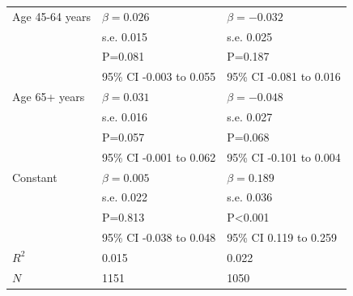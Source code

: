 \begin{table}[H]
\begin{tabular}{lll}
\rowcolor[gray]{0.93}
Age 45-64 years & $\beta=0.026$ & $\beta=-0.032$ \\ 
\rowcolor[gray]{0.93}
 & s.e. 0.015 & s.e. 0.025 \\ 
\rowcolor[gray]{0.93}
 & P=0.081 & P=0.187 \\ 
\rowcolor[gray]{0.93}
 & 95\% CI -0.003 to 0.055 & 95\% CI -0.081 to 0.016 \\ 
Age 65+ years & $\beta=0.031$ & $\beta=-0.048$ \\ 
 & s.e. 0.016 & s.e. 0.027 \\ 
 & P=0.057 & P=0.068 \\ 
 & 95\% CI -0.001 to 0.062 & 95\% CI -0.101 to 0.004 \\ 
\rowcolor[gray]{0.93}
Constant & $\beta=0.005$ & $\beta=0.189$ \\ 
\rowcolor[gray]{0.93}
 & s.e. 0.022 & s.e. 0.036 \\ 
\rowcolor[gray]{0.93}
 & P=0.813 & P<0.001 \\ 
\rowcolor[gray]{0.93}
 & 95\% CI -0.038 to 0.048 & 95\% CI 0.119 to 0.259 \\ 
\hline
$R^2$ & 0.015 & 0.022 \\ 
$N$ & 1151 & 1050 \\ 
\hline
\end{tabular}
\end{table}
